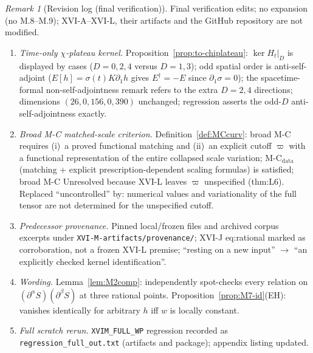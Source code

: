 \documentclass{article}
\theoremstyle{remark}
\newtheorem{remark}[proposition]{Remark}
\begin{document}
\begin{remark}[Revision log (final verification)]
\label{rem:revlog-final}
Final verification edits; no expansion (no M.8--M.9); XVI-A--XVI-L, their artifacts and the GitHub repository are not modified.
\begin{enumerate}
\item \emph{Time-only $\chi$-plateau kernel.} Proposition~\ref{prop:to-chiplateau}: $\ker H_t|_D$ is displayed by cases ($D=0,2,4$ versus $D=1,3$); odd spatial order is anti-self-adjoint ($E[h]=\sigma(t)K\partial_1 h$ gives $E^\dagger=-E$ since $\partial_1\sigma=0$); the spacetime-formal non-self-adjointness remark refers to the extra $D=2,4$ directions; dimensions $(26,0,156,0,390)$ unchanged; regression asserts the odd-$D$ anti-self-adjointness exactly.
\item \emph{Broad M-C matched-scale criterion.} Definition~\ref{def:MCcurv}: broad M-C requires (i)~a proved functional matching and (ii)~an explicit cutoff $\varpi$ with a functional representation of the entire collapsed scale variation; M-C$_{\mathrm{data}}$ (matching + explicit prescription-dependent scaling formulas) is satisfied; broad M-C Unresolved because XVI-L leaves $\varpi$ unspecified (thm:L6). Replaced ``uncontrolled'' by: numerical values and variationality of the full tensor are not determined for the unspecified cutoff.
\item \emph{Predecessor provenance.} Pinned local/frozen files and archived corpus excerpts under \texttt{XVI-M-artifacts/\allowbreak provenance/}; XVI-J eq:rational marked as corroboration, not a frozen XVI-L premise; ``resting on a new input'' $\to$ ``an explicitly checked kernel identification''.
\item \emph{Wording.} Lemma~\ref{lem:M2comp}: independently spot-checks every relation on $(\partial^\alpha S)(\partial^\beta S)$ at three rational points. Proposition~\ref{prop:M7-id}(EH): vanishes identically for arbitrary $h$ iff $w$ is locally constant.
\item \emph{Full scratch rerun.} \texttt{XVIM\_FULL\_WP} regression recorded as \texttt{regression\_full\_\allowbreak out.txt} (artifacts and package); appendix listing updated.
\end{enumerate}
\end{remark}
\end{document}
